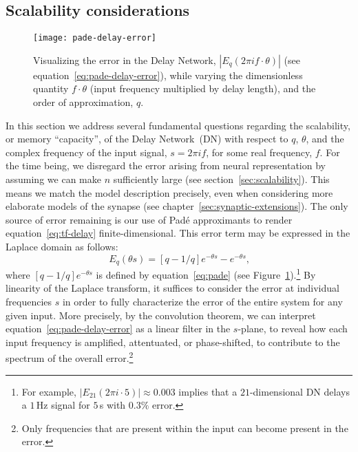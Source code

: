 \subsection{Scalability considerations}
\label{sec:delay-scalability}

\begin{figure}
\centering
  \texttt{[image: pade-delay-error]}
  \caption{ \label{fig:pade-delay-error} 
    Visualizing the error in the Delay Network, $|E_q(2 \pi i f \cdot \theta)|$ (see equation~\ref{eq:pade-delay-error}), while varying the dimensionless quantity $f \cdot \theta$ (input frequency multiplied by delay length), and the order of approximation, $q$.
  } 
\end{figure}

In this section we address several fundamental questions regarding the scalability, or memory ``capacity'', of the Delay Network~(DN) with respect to $q$, $\theta$, and the complex frequency of the input signal, $s = 2 \pi i f$, for some real frequency, $f$.
For the time being, we disregard the error arising from neural representation by assuming we can make $n$ sufficiently large (see section~\ref{sec:scalability}).
This means we match the model description precisely, even when considering more elaborate models of the synapse (see chapter~\ref{sec:synaptic-extensions}).
The only source of error remaining is our use of Pad\'e approximants to render equation~\ref{eq:tf-delay} finite-dimensional.
This error term may be expressed in the Laplace domain as follows:
\begin{equation} \label{eq:pade-delay-error}
E_q(\theta s) = [q-1/q]e^{-\theta s} - e^{-\theta s} \text{,}
\end{equation}
where $[q-1/q]e^{-\theta s}$ is defined by equation~\ref{eq:pade} (see Figure~\ref{fig:pade-delay-error}).\footnote{%
For example, $|E_{21}(2 \pi i \cdot 5)| \approx 0.003$ implies that a $21$-dimensional DN delays a $1$\,Hz signal for $5$\,s with $0.3\%$ error.}
By linearity of the Laplace transform, it suffices to consider the error at individual frequencies $s$ in order to fully characterize the error of the entire system for any given input.
More precisely, by the convolution theorem, we can interpret equation~\ref{eq:pade-delay-error} as a linear filter in the $s$-plane, to reveal how each input frequency is amplified, attentuated, or phase-shifted, to contribute to the spectrum of the overall error.\footnote{%
Only frequencies that are present within the input can become present in the error.}

